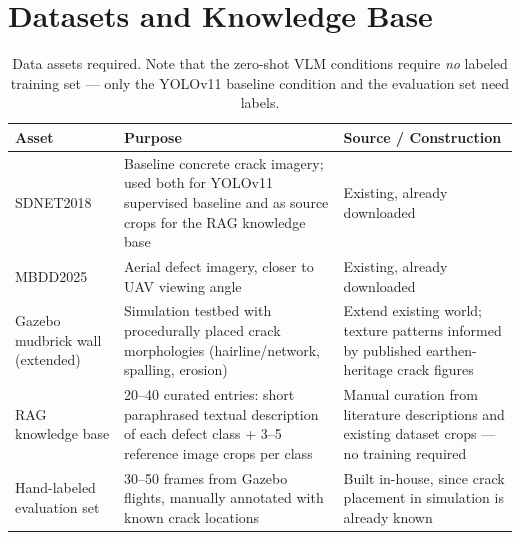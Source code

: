 \documentclass[11pt,a4paper]{article}
\begin{document}
\section{Datasets and Knowledge Base}

\begin{table}[h!]
\centering
\small
\begin{tabular}{p{3.4cm}p{5.2cm}p{5.2cm}}
\toprule
\textbf{Asset} & \textbf{Purpose} & \textbf{Source / Construction} \\
\midrule
SDNET2018 & Baseline concrete crack imagery; used both for YOLOv11 supervised baseline and as source crops for the RAG knowledge base & Existing, already downloaded \\
MBDD2025 & Aerial defect imagery, closer to UAV viewing angle & Existing, already downloaded \\
Gazebo mudbrick wall (extended) & Simulation testbed with procedurally placed crack morphologies (hairline/network, spalling, erosion) & Extend existing world; texture patterns informed by published earthen-heritage crack figures \\
RAG knowledge base & 20--40 curated entries: short paraphrased textual description of each defect class + 3--5 reference image crops per class & Manual curation from literature descriptions and existing dataset crops --- no training required \\
Hand-labeled evaluation set & 30--50 frames from Gazebo flights, manually annotated with known crack locations & Built in-house, since crack placement in simulation is already known \\
\bottomrule
\end{tabular}
\caption{Data assets required. Note that the zero-shot VLM conditions require \emph{no} labeled training set --- only the YOLOv11 baseline condition and the evaluation set need labels.}
\label{tab:datasets}
\end{table}
\end{document}
